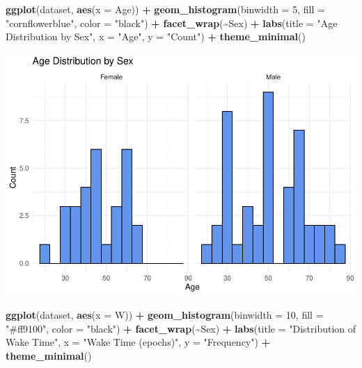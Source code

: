 \documentclass[
]{article}
\newenvironment{Shaded}{\begin{snugshade}}{\end{snugshade}}
\newcommand{\AttributeTok}[1]{\textcolor[rgb]{0.13,0.29,0.53}{#1}}
\newcommand{\DecValTok}[1]{\textcolor[rgb]{0.00,0.00,0.81}{#1}}
\newcommand{\FunctionTok}[1]{\textcolor[rgb]{0.13,0.29,0.53}{\textbf{#1}}}
\newcommand{\NormalTok}[1]{#1}
\newcommand{\SpecialCharTok}[1]{\textcolor[rgb]{0.81,0.36,0.00}{\textbf{#1}}}
\newcommand{\StringTok}[1]{\textcolor[rgb]{0.31,0.60,0.02}{#1}}
\begin{document}
\begin{Shaded}
\begin{Highlighting}[]
\FunctionTok{ggplot}\NormalTok{(dataset, }\FunctionTok{aes}\NormalTok{(}\AttributeTok{x =}\NormalTok{ Age)) }\SpecialCharTok{+} 
  \FunctionTok{geom\_histogram}\NormalTok{(}\AttributeTok{binwidth =} \DecValTok{5}\NormalTok{, }\AttributeTok{fill =} \StringTok{"cornflowerblue"}\NormalTok{, }\AttributeTok{color =} \StringTok{"black"}\NormalTok{) }\SpecialCharTok{+} 
  \FunctionTok{facet\_wrap}\NormalTok{(}\SpecialCharTok{\textasciitilde{}}\NormalTok{Sex) }\SpecialCharTok{+} 
  \FunctionTok{labs}\NormalTok{(}\AttributeTok{title =} \StringTok{"Age Distribution by Sex"}\NormalTok{, }\AttributeTok{x =} \StringTok{"Age"}\NormalTok{, }\AttributeTok{y =} \StringTok{"Count"}\NormalTok{) }\SpecialCharTok{+}
  \FunctionTok{theme\_minimal}\NormalTok{()}
\end{Highlighting}
\end{Shaded}

\includegraphics{602_project_files/figure-latex/unnamed-chunk-15-1.pdf}

\begin{Shaded}
\begin{Highlighting}[]
\FunctionTok{ggplot}\NormalTok{(dataset, }\FunctionTok{aes}\NormalTok{(}\AttributeTok{x =}\NormalTok{ W)) }\SpecialCharTok{+} 
  \FunctionTok{geom\_histogram}\NormalTok{(}\AttributeTok{binwidth =} \DecValTok{10}\NormalTok{, }\AttributeTok{fill =} \StringTok{"\#ff9100"}\NormalTok{, }\AttributeTok{color =} \StringTok{"black"}\NormalTok{) }\SpecialCharTok{+} \FunctionTok{facet\_wrap}\NormalTok{(}\SpecialCharTok{\textasciitilde{}}\NormalTok{Sex) }\SpecialCharTok{+} 
  \FunctionTok{labs}\NormalTok{(}\AttributeTok{title =} \StringTok{"Distribution of Wake Time"}\NormalTok{, }\AttributeTok{x =} \StringTok{"Wake Time (epochs)"}\NormalTok{,}
       \AttributeTok{y =} \StringTok{"Frequency"}\NormalTok{) }\SpecialCharTok{+} 
  \FunctionTok{theme\_minimal}\NormalTok{()}
\end{Highlighting}
\end{Shaded}
\end{document}
